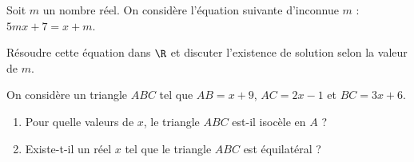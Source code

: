 
Soit $m$ un nombre réel. On considère l'équation suivante d'inconnue $m$ : $5mx+7 = x+m$.

Résoudre cette équation dans $\R$ et discuter l'existence de solution selon la valeur de $m$.




On considère un triangle $ABC$ tel que $AB = x+9$, $AC= 2x-1$ et $BC = 3x+6$.

\begin{enumerate}
\item Pour quelle valeurs de $x$, le triangle $ABC$ est-il isocèle en $A$ ?
\item Existe-t-il un réel $x$ tel que le triangle $ABC$ est équilatéral ?
\end{enumerate}
